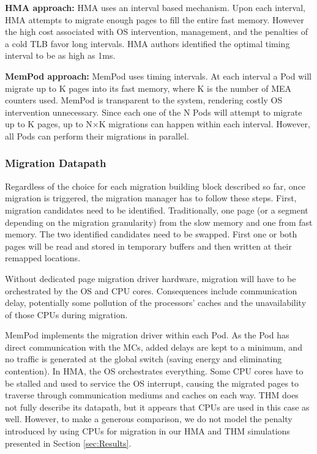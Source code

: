 	\textbf{HMA approach:} HMA uses an interval based mechanism. Upon each interval, HMA attempts to migrate enough pages to fill the entire fast memory. However the high cost associated with OS intervention, management, and the penalties of a cold TLB favor long intervals. HMA authors identified the optimal timing interval to be as high as 1ms.
	
	\textbf{MemPod approach:} MemPod uses timing intervals. At each interval a Pod will migrate up to K pages into its fast memory, where K is the number of MEA counters used. MemPod is transparent to the system, rendering costly OS intervention unnecessary. Since each one of the N Pods will attempt to migrate up to K pages, up to N$\times$K migrations can happen within each interval. However, all Pods can perform their migrations in parallel. %
	

\subsubsection{Migration Datapath}

Regardless of the choice for each migration building block described so far, once migration is triggered, the migration manager has to follow these 
steps. First, migration candidates need to be identified. Traditionally, one page (or a segment depending on the migration granularity) from the slow memory and one from fast memory. The two identified candidates need to be swapped. First one or both pages will be read and stored in temporary buffers and then written at their remapped locations.

Without dedicated page migration driver hardware, migration will have to be orchestrated by the OS and CPU cores. Consequences include communication delay, 
potentially some pollution of the processors' caches 
and the unavailability of those CPUs during migration. 

MemPod implements the migration driver within each Pod. As the Pod has direct communication with the MCs, added delays are kept to a minimum,
and no traffic is generated at the global switch (saving energy and eliminating contention).
In HMA, the OS orchestrates everything. Some CPU cores have to be stalled and used to service the OS interrupt, causing the migrated pages to traverse through communication mediums and caches on each way. THM does not fully describe its datapath, but it appears that CPUs are used in this case as well. 
However, to make a generous comparison, we do not model the penalty introduced by using CPUs for migration in our HMA and THM simulations presented in Section \ref{sec:Results}.

